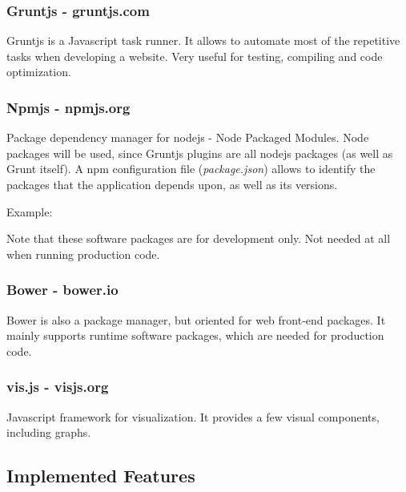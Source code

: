     \subsubsection{Gruntjs - gruntjs.com} %
      \label{ssub:gruntjs}
        Gruntjs is a Javascript task runner.
        It allows to automate most of the repetitive tasks when developing a website.
        Very useful for testing, compiling and code optimization.

    \subsubsection{Npmjs - npmjs.org} %
    \label{ssub:npm}
      Package dependency manager for nodejs - Node Packaged Modules.
      Node packages will be used, since Gruntjs plugins are all nodejs packages (as well as Grunt itself).
      A npm configuration file (\emph{package.json}) allows to identify the packages that the application depends upon, as well as its versions.

      Example: 

      

      Note that these software packages are for development only. Not needed at all when running production code.

    \subsubsection{Bower - bower.io} %
    \label{ssub:bower}
    
    Bower is also a package manager, but oriented for web front-end packages.
    It mainly supports runtime software packages, which are needed for production code.


    \subsubsection{vis.js - visjs.org} %
    \label{ssub:visjs}
      Javascript framework for visualization.
      It provides a few visual components, including graphs.


  \subsection{Implemented Features} %
    \label{sub:main_features}
    
